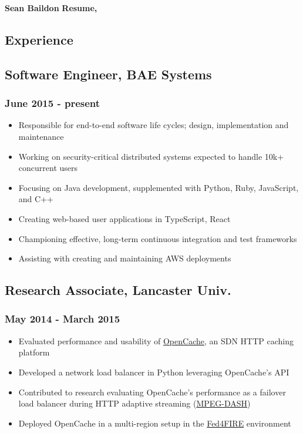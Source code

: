 \documentclass[a4paper,11pt]{article}
\begin{document}
\large
\noindent\textbf{Sean Baildon}
\hfill
\noindent\textbf{Resume, \the\year}
\normalsize

\vspace{2ex}
\hrulefill
\vspace{1ex}

\begin{multicols*}{2}

\section*{Experience}
\subsection*{Software Engineer, BAE Systems}
\subsubsection*{June 2015 - present}
\begin{itemize}[leftmargin=*]
	\item Responsible for end-to-end software life cycles; design, implementation and maintenance
	\item Working on security-critical distributed systems expected to handle 10k+ concurrent users
	\item Focusing on Java development, supplemented with Python, Ruby, JavaScript, and C++
	\item Creating web-based user applications in TypeScript, React
	\item Championing effective, long-term continuous integration and test frameworks
	\item Assisting with creating and maintaining AWS deployments
\end{itemize}

\subsection*{Research Associate, Lancaster Univ.}
\subsubsection*{May 2014 - March 2015}
\begin{itemize}[leftmargin=*]
	\item Evaluated performance and usability of \href{https://github.com/broadbent/opencache}{OpenCache}, an SDN HTTP caching platform
	\item Developed a network load balancer in Python leveraging OpenCache's API
	\item Contributed to research evaluating OpenCache's performance as a failover load balancer during HTTP adaptive streaming (\href{https://en.wikipedia.org/wiki/Dynamic_Adaptive_Streaming_over_HTTP}{MPEG-DASH})
	\item Deployed OpenCache in a multi-region setup in the \href{https://www.fed4fire.eu}{Fed4FIRE} environment
\end{itemize}


\end{multicols*}
\end{document}
